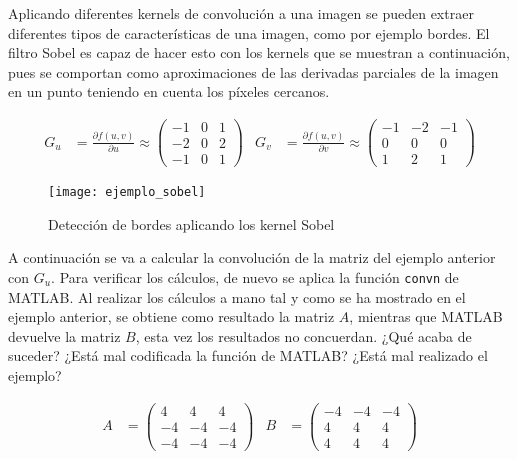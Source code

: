 		Aplicando diferentes kernels de convolución a una imagen se pueden extraer diferentes tipos de características de una imagen, como por ejemplo bordes. El filtro Sobel es capaz de hacer esto con los kernels que se muestran a continuación, pues se comportan como aproximaciones de las derivadas parciales de la imagen en un punto teniendo en cuenta los píxeles cercanos\cite{Gao2010}. 
		
		\begin{align*}
			G_u &= \frac{\partial f(u, v)}{\partial u} \approx \begin{pmatrix}
				-1 & 0 & 1\\
				-2 & 0 & 2\\
				-1 & 0 & 1
			\end{pmatrix}&
			G_v &= \frac{\partial f(u, v)}{\partial v} \approx \begin{pmatrix}
				-1 & -2 & -1\\
				0 & 0 & 0\\
				1 & 2 & 1
			\end{pmatrix}
		\end{align*}
		
		\begin{figure}[!h]
			\centering
			\texttt{[image: ejemplo\_sobel]}
			\caption{Detección de bordes aplicando los kernel Sobel}
			\label{fig:sobel}
		\end{figure}
		
		A continuación se va a calcular la convolución de la matriz del ejemplo anterior con $G_u$. Para verificar los cálculos, de nuevo se aplica la función \texttt{convn} de MATLAB. Al realizar los cálculos a mano tal y como se ha mostrado en el ejemplo anterior, se obtiene como resultado la matriz $A$, mientras que MATLAB devuelve la matriz $B$, esta vez los resultados no concuerdan. ¿Qué acaba de suceder? ¿Está mal codificada la función de MATLAB? ¿Está mal realizado el ejemplo?
		
		\begin{align*} A &= 
			\begin{pmatrix}
				4 & 4 & 4\\
				-4 & -4 & -4\\
				-4 & -4 & -4
			\end{pmatrix}&
			B &= \begin{pmatrix}
				-4 & -4 & -4\\
				4 & 4 & 4\\
				4 & 4 & 4
				\end{pmatrix}
		\end{align*}
		
